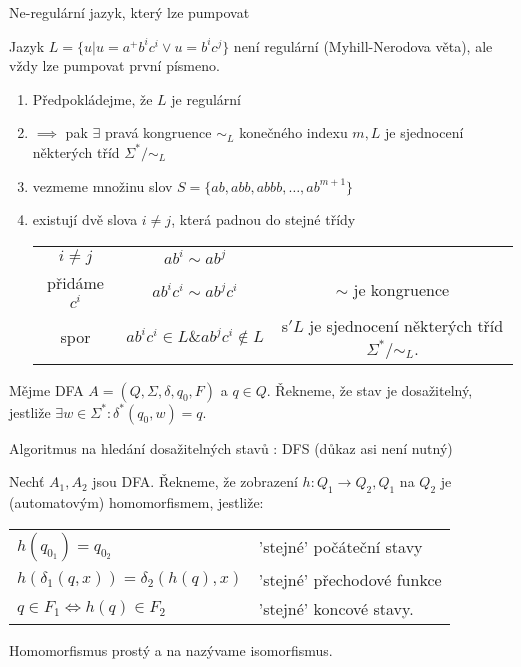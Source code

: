 \documentclass[../main.tex]{subfiles}
\begin{document}
\begin{example}
    Ne-regulární jazyk, který lze pumpovat

    Jazyk $L=\{u|u = a^+b^ic^i\vee u = b^ic^j\}$ není regulární (Myhill-Nerodova věta), ale 
    vždy lze pumpovat první písmeno.
    \begin{enumerate}
        \item Předpokládejme, že $L$ je regulární
        \item $\implies$ pak $\exists$ pravá kongruence $\sim_L$ konečného indexu $m, L$ je sjednocení
        některých tříd $\Sigma^*/\sim_L$
        \item vezmeme množinu slov $S = \{ab,abb,abbb,\dots,ab^{m+1}\}$
        \item existují dvě slova $i \neq j$, která padnou do stejné třídy\\
        \begin{tabular}{c c c}
            $i \neq j$ & $ab^i \sim ab^j$ & \\
            přidáme $c^i$ & $ab^ic^i \sim ab^jc^i$ & $\sim$ je kongruence \\
            spor & $ab^ic^i \in L \& ab^jc^i \notin L$ & s$'L$ je sjednocení některých tříd $\Sigma^*/\sim_L$. 
        \end{tabular}
    \end{enumerate}
\end{example}

\begin{definition}
    Mějme DFA $A = (Q,\Sigma,\delta,q_0,F)$ a $q\in Q$. Řekneme, že stav je dosažitelný,
    jestliže $\exists w \in \Sigma^* : \delta^*(q_0,w) = q$.
\end{definition}

\begin{example}
    Algoritmus na hledání dosažitelných stavů : DFS (důkaz asi není nutný)
\end{example}

\begin{definition}
    Nechť $A_1,A_2$ jsou DFA. Řekneme, že zobrazení $h: Q_1 \rightarrow Q_2, Q_1$ na $Q_2$ je 
    (automatovým) homomorfismem, jestliže:\\
    \begin{center}
        \begin{tabular}{l l}
            $h(q_{0_1})=q_{0_2}$ & 'stejné' počáteční stavy \\
            $h(\delta_1(q,x)) = \delta_2(h(q),x)$ & 'stejné' přechodové funkce \\
            $q \in F_1 \Leftrightarrow h(q) \in F_2$ & 'stejné' koncové stavy. \\
        \end{tabular}
    \end{center}
    Homomorfismus prostý a na nazývame isomorfismus.
\end{definition}
\end{document}
